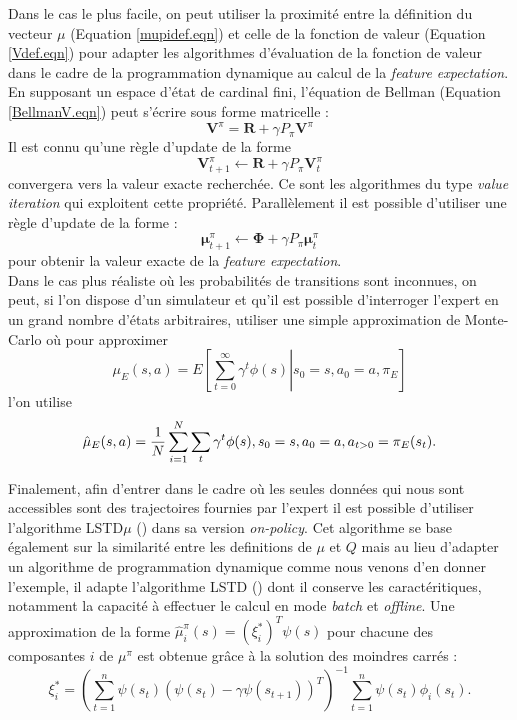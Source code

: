 \documentclass[publibook-draft]{CAp2012}
\begin{document}
Dans le cas le plus facile, on peut utiliser la proximité entre la définition du vecteur $\mu$ (Equation \ref{mupidef.eqn}) et celle de la fonction de valeur (Equation \ref{Vdef.eqn}) pour adapter les algorithmes d'évaluation de la fonction de valeur dans le cadre de la programmation dynamique au calcul de la {\it feature expectation}.\\
En supposant un espace d'état de cardinal fini, l'équation de Bellman (Equation \ref{BellmanV.eqn}) peut s'écrire sous forme matricelle :
\begin{equation}
\mathbf V^\pi = \mathbf R + \gamma P_\pi\mathbf V^\pi
\end{equation}
Il est connu qu'une règle d'update de la forme
\begin{equation}
\mathbf V^\pi_{t+1} \leftarrow \mathbf R + \gamma P_\pi\mathbf V^\pi_t
\end{equation}
convergera vers la valeur exacte recherchée. Ce sont les algorithmes du type \emph{value iteration} qui exploitent cette propriété. Parallèlement il est possible d'utiliser une règle d'update de la forme :
\begin{equation}
\mathbf \mu^\pi_{t+1} \leftarrow \mathbf\Phi + \gamma P_\pi\mathbf\mu^\pi_t
\end{equation}
pour obtenir la valeur exacte de la {\it feature expectation}.\\

Dans le cas plus réaliste où les probabilités de transitions sont inconnues, on peut, si l'on dispose d'un simulateur et qu'il est possible d'interroger l'expert en un grand nombre d'états arbitraires, utiliser une simple approximation de Monte-Carlo où pour approximer
\begin{equation}
\mu_E(s,a) = E\left.\left[\sum\limits_{t=0}^\infty \gamma^t \phi(s)\right|s_0 = s, a_0 = a, \pi_E\right]
\end{equation}
 l'on utilise
\begin{equation}
\hat\mu_E(s,a) = {1\over N}\sum\limits_{i=1}^{N}\sum\limits_{t}\gamma^t\phi(s), s_0=s, a_0=a, a_{t>0} = \pi_E(s_t).
\end{equation}

Finalement, afin d'entrer dans le cadre où les seules données qui nous sont accessibles sont des trajectoires fournies par l'expert il est possible d'utiliser l'algorithme LSTD$\mu$ (\citep{klein2011batch}) dans sa version \emph{on-policy}. Cet algorithme se base également sur la similarité entre les definitions de $\mu$ et $Q$ mais au lieu d'adapter un algorithme de programmation dynamique comme nous venons d'en donner l'exemple, il adapte l'algorithme LSTD (\cite{bradtke1996linear}) dont il conserve les caractéritiques, notamment la capacité à effectuer le calcul en mode {\it batch} et {\it offline}. Une approximation de la forme $\hat{\mu}_i^\pi(s) = (\xi_i^*)^T \psi(s)$ pour chacune des composantes $i$ de $\mu^\pi$ est obtenue grâce à la solution des moindres carrés :
\begin{equation}
  \xi_i^* = \left(\sum_{t=1}^n
  \psi(s_t)(\psi(s_t)-\gamma\psi(s_{t+1}))^T\right)^{-1}
  \sum_{t=1}^n \psi(s_t) \phi_i(s_t).
\end{equation}
\end{document}
